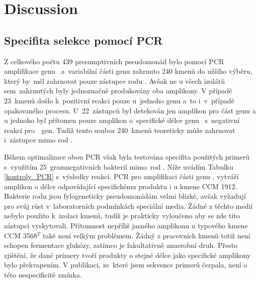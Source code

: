\chapter{Discussion}

\section{Specifita selekce pomocí PCR}
Z celkového počtu 439 presumptivních pseudomonád bylo pomocí PCR amplifikace genu~ a~variabilní části genu  zahrnuto 240 kmenů do užšího výběru, který by~měl zahrnovat pouze zástupce rodu .
Avšak ne u všech izolátů sem~zahrnutých byly jednoznačně produkovány oba amplikony.
V případě 23~kmenů došlo k~pozitivní reakci pouze u~jednoho genu a~to i~v~případě opakovaného procesu.
U~22~zástupců byl detekován jen amplikon pro část genu  a u jednoho byl přítomen pouze amplikon o~specifické délce genu~ s~negativní reakcí pro~~gen.
Tudíž tento soubor 240~kmenů teoreticky může zahrnovat i~zástupce mimo rod .

Během optimalizace obou PCR však byla testována specifita použitých primerů s~využitím 25~gramnegativních bakterií mimo~rod .
Níže uvádím Tabulku \ref{kontroly_PCR} s~výsledky reakcí.
PCR pro amplifikaci části genu , vytváří amplikon o délce odpovídající specifickému produktu i u kmene  CCM 1912.
Bakterie rodu  jsou fylogeneticky pseudomonádám velmi blízké, avšak vyžadují pro svůj růst v~laboratorních podmínkách speciální media.
Žádné z těchto medií nebylo použito k~izolaci kmenů, tudíž je prakticky vyloučeno aby se zde tito zástupci vyskytovali.
Přítomnost nepříliš jasného amplikonu u typového kmene  CCM 3568$^T$ také není velkým problémem.
Žádný z pracovních kmenů totiž není schopen fermentace glukózy, zatímco  je fakultativně anaerobní druh.
Přesto zjištění, že dané primery tvoří produkty o stejné délce jako specifické amplikony bylo překvapením.
V publikaci, ze~které jsem sekvence primerů čerpala, není o této nespecificitě zmínka. \cite{nair2014molecular}

